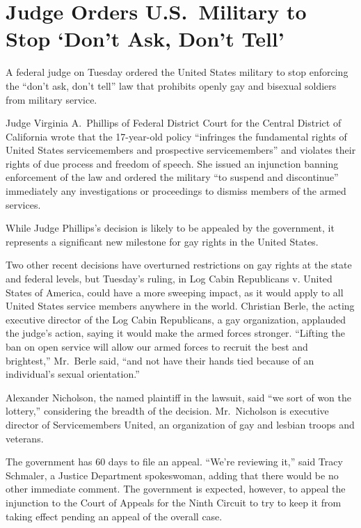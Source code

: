 ﻿\documentclass[12pt]{article}
\begin{document}
\section{Judge Orders U.S.~Military to Stop `Don't Ask, Don't Tell'}

\lettrine{A}{} federal judge on Tuesday ordered the United States military
to stop enforcing the ``don't ask, don't tell'' law that prohibits openly gay and bisexual soldiers
from military service.

Judge Virginia A.~Phillips of Federal District Court for the Central District of California wrote
that the 17-year-old policy ``infringes the fundamental rights of United States servicemembers and
prospective servicemembers'' and violates their rights of due process and freedom of speech. She
issued an injunction banning enforcement of the law and ordered the military ``to suspend and
discontinue'' immediately any investigations or proceedings to dismiss members of the armed
services.

While Judge Phillips's decision is likely to be appealed by the government, it represents a
significant new milestone for gay rights in the United States.

Two other recent decisions have overturned restrictions on gay rights at the state and federal
levels, but Tuesday's ruling, in Log Cabin Republicans v. United States of America, could have a
more sweeping impact, as it would apply to all United States service members anywhere in the world.
Christian Berle, the acting executive director of the Log Cabin Republicans, a gay organization,
applauded the judge's action, saying it would make the armed forces stronger. ``Lifting the ban on
open service will allow our armed forces to recruit the best and brightest,'' Mr.~Berle said, ``and
not have their hands tied because of an individual's sexual orientation.''

Alexander Nicholson, the named plaintiff in the lawsuit, said ``we sort of won the lottery,''
considering the breadth of the decision. Mr.~Nicholson is executive director of Servicemembers
United, an organization of gay and lesbian troops and veterans.

The government has 60 days to file an appeal. ``We're reviewing it,'' said Tracy Schmaler, a Justice
Department spokeswoman, adding that there would be no other immediate comment. The government is
expected, however, to appeal the injunction to the Court of Appeals for the Ninth Circuit to try to
keep it from taking effect pending an appeal of the overall case.
\end{document}

